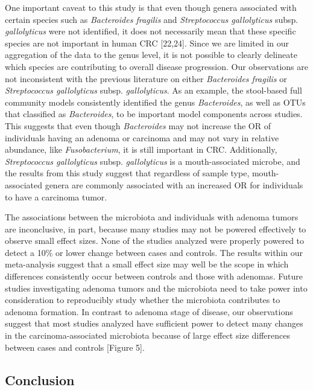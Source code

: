 \documentclass[12pt,]{article}
\begin{document}
One important caveat to this study is that even though genera associated
with certain species such as \emph{Bacteroides fragilis} and
\emph{Streptococcus gallolyticus} subsp. \emph{gallolyticus} were not
identified, it does not necessarily mean that these specific species are
not important in human CRC {[}22,24{]}. Since we are limited in our
aggregation of the data to the genus level, it is not possible to
clearly delineate which species are contributing to overall disease
progression. Our observations are not inconsistent with the previous
literature on either \emph{Bacteroides fragilis} or \emph{Streptococcus
gallolyticus} subsp. \emph{gallolyticus}. As an example, the stool-based
full community models consistently identified the genus
\emph{Bacteroides}, as well as OTUs that classified as
\emph{Bacteroides}, to be important model components across studies.
This suggests that even though \emph{Bacteroides} may not increase the
OR of individuals having an adenoma or carcinoma and may not vary in
relative abundance, like \emph{Fusobacterium}, it is still important in
CRC. Additionally, \emph{Streptococcus gallolyticus} subsp.
\emph{gallolyticus} is a mouth-associated microbe, and the results from
this study suggest that regardless of sample type, mouth-associated
genera are commonly associated with an increased OR for individuals to
have a carcinoma tumor.

The associations between the microbiota and individuals with adenoma
tumors are inconclusive, in part, because many studies may not be
powered effectively to observe small effect sizes. None of the studies
analyzed were properly powered to detect a 10\% or lower change between
cases and controls. The results within our meta-analysis suggest that a
small effect size may well be the scope in which differences
consistently occur between controls and those with adenomas. Future
studies investigating adenoma tumors and the microbiota need to take
power into consideration to reproducibly study whether the microbiota
contributes to adenoma formation. In contrast to adenoma stage of
disease, our observations suggest that most studies analyzed have
sufficient power to detect many changes in the carcinoma-associated
microbiota because of large effect size differences between cases and
controls {[}Figure 5{]}.

\newpage

\subsection{Conclusion}\label{conclusion}
\end{document}
